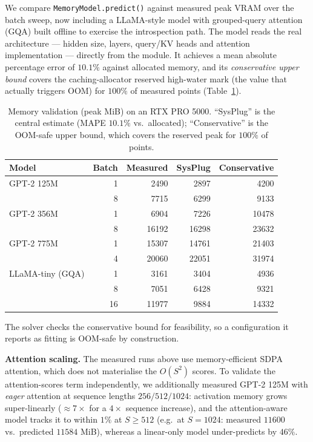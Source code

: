 \documentclass[10pt,twocolumn]{article}
\begin{document}
We compare \texttt{MemoryModel.predict()} against measured peak VRAM over the
batch sweep, now including a LLaMA-style model with grouped-query attention
(GQA) built offline to exercise the introspection path. The model reads the real
architecture --- hidden size, layers, query/KV heads and attention
implementation --- directly from the module. It achieves a mean absolute
percentage error of $10.1\%$ against allocated memory, and its \emph{conservative
upper bound} covers the caching-allocator reserved high-water mark (the value
that actually triggers OOM) for $100\%$ of measured points
(Table~\ref{tab:mem}).

\begin{table}[h]
\centering
\caption{Memory validation (peak MiB) on an RTX PRO 5000. ``SysPlug'' is the
central estimate (MAPE $10.1\%$ vs.\ allocated); ``Conservative'' is the OOM-safe
upper bound, which covers the reserved peak for $100\%$ of points.}
\label{tab:mem}
\begin{tabular}{lrrrr}
\toprule
Model & Batch & Measured & SysPlug & Conservative \\
\midrule
GPT-2 125M       &  1 & 2490 & 2897 & 4200 \\
                 &  8 & 7715 & 6299 & 9133 \\
GPT-2 356M       &  1 & 6904 & 7226 & 10478 \\
                 &  8 & 16192 & 16298 & 23632 \\
GPT-2 775M       &  1 & 15307 & 14761 & 21403 \\
                 &  4 & 20060 & 22051 & 31974 \\
LLaMA-tiny (GQA) &  1 & 3161 & 3404 & 4936 \\
                 &  8 & 7051 & 6428 & 9321 \\
                 & 16 & 11977 & 9884 & 14332 \\
\bottomrule
\end{tabular}
\end{table}

The solver checks the conservative bound for feasibility, so a configuration it
reports as fitting is OOM-safe by construction.

\textbf{Attention scaling.} The measured runs above use memory-efficient SDPA
attention, which does not materialise the $O(S^2)$ scores. To validate the
attention-scores term independently, we additionally measured GPT-2 125M with
\emph{eager} attention at sequence lengths $256/512/1024$: activation memory
grows super-linearly (${\approx}7\times$ for a $4\times$ sequence increase), and
the attention-aware model tracks it to within $1\%$ at $S \geq 512$
(e.g.\ at $S{=}1024$: measured $11600$ vs.\ predicted $11584$ MiB), whereas a
linear-only model under-predicts by $46\%$.
\end{document}
